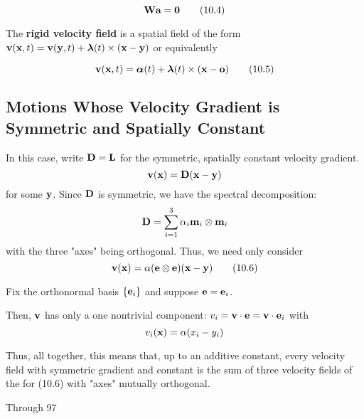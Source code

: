 \documentclass{article}
\begin{document}
\[
	\textbf{W}\textbf{a} = \textbf{0}\tag{10.4}
\]

The \textbf{rigid velocity field} is a spatial field of the form $\textbf{v}(\textbf{x},t) = \textbf{v}(\textbf{y},t) + \boldsymbol{\lambda}(t)\times(\textbf{x} - \textbf{y})$ or equivalently

\[
	\textbf{v}(\textbf{x},t) = \boldsymbol{\alpha}(t) + \boldsymbol{\lambda}(t)\times(\textbf{x}-\textbf{o})\tag{10.5}
\] 
\subsection{Motions Whose Velocity Gradient is Symmetric and Spatially Constant}
In this case, write $\textbf{D} = \textbf{L}$ for the symmetric, spatially constant velocity gradient.
\[
	\textbf{v}(\textbf{x}) = \textbf{D}(\textbf{x}-\textbf{y})
\]
for some $\textbf{y}$. Since $\textbf{D}$ is symmetric, we have the spectral decomposition:
\[
	\textbf{D} = \sum_{i=1}^{3}\alpha_i\textbf{m}_i\otimes\textbf{m}_i
\]
with the three "axes" being orthogonal. Thus, we need only consider
\[
	\textbf{v}(\textbf{x}) = \alpha(\textbf{e}\otimes\textbf{e})(\textbf{x}-\textbf{y})\tag{10.6}
\]

Fix the orthonormal basis $\lbrace \textbf{e}_i\rbrace$ and suppose $\textbf{e} = \textbf{e}_i$. 

Then, $\textbf{v}$ has only a one nontrivial component: $v_i = \textbf{v}\cdot\textbf{e} = \textbf{v}\cdot\textbf{e}_i$ with
\[
	v_i(\textbf{x}) = \alpha(x_i-y_i)
\]

\begin{remark}
	Thus, all together, this means that, up to an additive constant, every velocity field with symmetric gradient and constant is the sum of three velocity fields of the for (10.6) with "axes" mutually orthogonal.
\end{remark}


Through 97
\end{document}
